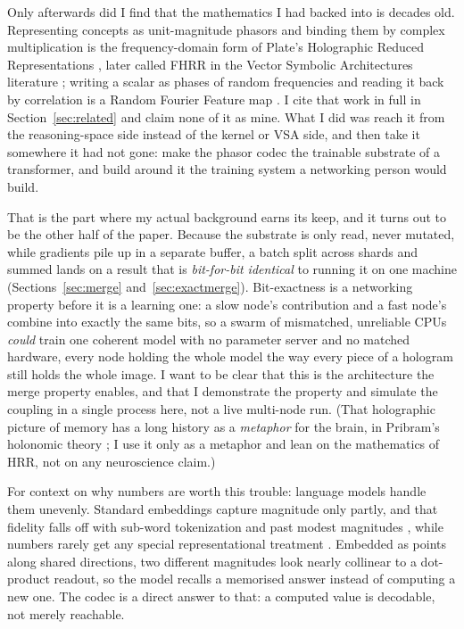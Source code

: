 \documentclass[11pt]{article}
\begin{document}
Only afterwards did I find that the mathematics I had backed into is decades old. Representing concepts
as unit-magnitude phasors and binding them by complex multiplication is the frequency-domain form of
Plate's Holographic Reduced Representations \parencite{plate1994thesis,plate1995hrr,plate2003hrr}, later called FHRR in the Vector
Symbolic Architectures literature \parencite{gayler2003vsa,kanerva2009hdc}; writing a scalar as phases of random
frequencies and reading it back by correlation is a Random Fourier Feature map \parencite{rahimi2007random}.
I cite that work in full in Section~\ref{sec:related} and claim none of it as mine. What I did was
reach it from the reasoning-space side instead of the kernel or VSA side, and then take it somewhere it
had not gone: make the phasor codec the trainable substrate of a transformer, and build around it the
training system a networking person would build.

That is the part where my actual background earns its keep, and it turns out to be the other half of
the paper. Because the substrate is only read, never mutated, while gradients pile up in a separate
buffer, a batch split across shards and summed lands on a result that is \emph{bit-for-bit identical}
to running it on one machine (Sections~\ref{sec:merge} and~\ref{sec:exactmerge}). Bit-exactness is a
networking property before it is a learning one: a slow node's contribution and a fast node's combine
into exactly the same bits, so a swarm of mismatched, unreliable CPUs \emph{could} train one coherent
model with no parameter server and no matched hardware, every node holding the whole model the way every
piece of a hologram still holds the whole image. I want to be clear that this is the architecture the
merge property enables, and that I demonstrate the property and simulate the coupling in a single process
here, not a live multi-node run. (That holographic picture of memory has a long history as a
\emph{metaphor} for the brain, in Pribram's holonomic theory \parencite{pribram1971languages,pribram1991brain}; I use it only as a
metaphor and lean on the mathematics of HRR, not on any neuroscience claim.)

For context on why numbers are worth this trouble: language models handle them unevenly. Standard
embeddings capture magnitude only partly, and that fidelity falls off with sub-word tokenization and
past modest magnitudes \parencite{wallace2019numeracy}, while numbers rarely get any special representational
treatment \parencite{thawani2021numbers}. Embedded as points along shared directions, two different magnitudes
look nearly collinear to a dot-product readout, so the model recalls a memorised answer instead of
computing a new one. The codec is a direct answer to that: a computed value is decodable, not merely
reachable.
\end{document}
